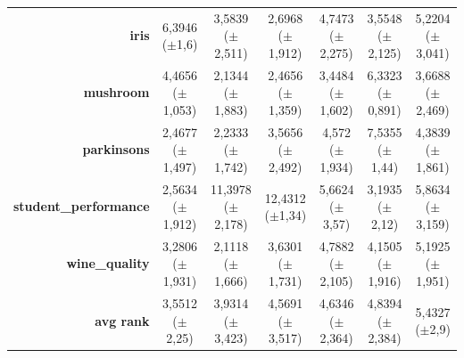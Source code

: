 \documentclass[preprint,review,12pt]{elsarticle}
\begin{document}
\begin{table}[htb]
{\begin{tabular}{r|ccc|c|c|c|}
			\textbf{iris}                 & \cellcolor[rgb]{ .965,  .91,  .514}6,3946 ($\pm$1,6)                               & \cellcolor[rgb]{ .525,  .784,  .49}3,5839 ($\pm$2,511)  & \cellcolor[rgb]{ .388,  .745,  .482}2,6968 ($\pm$1,912) & \cellcolor[rgb]{ .706,  .835,  .498}4,7473 ($\pm$2,275) & \cellcolor[rgb]{ .522,  .78,  .486}3,5548 ($\pm$2,125)  & \cellcolor[rgb]{ .78,  .859,  .502}5,2204 ($\pm$3,041)  \\
			\textbf{mushroom}             & \cellcolor[rgb]{ .71,  .835,  .498}4,4656 ($\pm$1,053)                             & \cellcolor[rgb]{ .388,  .745,  .482}2,1344 ($\pm$1,883) & \cellcolor[rgb]{ .431,  .757,  .482}2,4656 ($\pm$1,359) & \cellcolor[rgb]{ .569,  .796,  .49}3,4484 ($\pm$1,602)  & \cellcolor[rgb]{ .969,  .91,  .514}6,3323 ($\pm$0,891)  & \cellcolor[rgb]{ .6,  .804,  .494}3,6688 ($\pm$2,469)   \\
			\textbf{parkinsons}           & \cellcolor[rgb]{ .412,  .749,  .482}2,4677 ($\pm$1,497)                            & \cellcolor[rgb]{ .388,  .745,  .482}2,2333 ($\pm$1,742) & \cellcolor[rgb]{ .541,  .788,  .49}3,5656 ($\pm$2,492)  & \cellcolor[rgb]{ .655,  .82,  .494}4,572 ($\pm$1,934)   & \cellcolor[rgb]{ 1,  .922,  .518}7,5355 ($\pm$1,44)     & \cellcolor[rgb]{ .635,  .816,  .494}4,3839 ($\pm$1,861) \\
			\textbf{student\_performance} & \cellcolor[rgb]{ .388,  .745,  .482}2,5634 ($\pm$1,912)                            & \cellcolor[rgb]{ .98,  .506,  .439}11,3978 ($\pm$2,178) & \cellcolor[rgb]{ .973,  .412,  .42}12,4312 ($\pm$1,34)  & \cellcolor[rgb]{ .843,  .875,  .506}5,6624 ($\pm$3,57)  & \cellcolor[rgb]{ .478,  .769,  .486}3,1935 ($\pm$2,12)  & \cellcolor[rgb]{ .875,  .882,  .51}5,8634 ($\pm$3,159)  \\
			\textbf{wine\_quality}        & \cellcolor[rgb]{ .569,  .796,  .49}3,2806 ($\pm$1,931)                             & \cellcolor[rgb]{ .388,  .745,  .482}2,1118 ($\pm$1,666) & \cellcolor[rgb]{ .624,  .812,  .494}3,6301 ($\pm$1,731) & \cellcolor[rgb]{ .808,  .863,  .506}4,7882 ($\pm$2,105) & \cellcolor[rgb]{ .706,  .835,  .498}4,1505 ($\pm$1,916) & \cellcolor[rgb]{ .871,  .882,  .51}5,1925 ($\pm$1,951)  \\
			\midrule
			\textbf{avg rank}             & \cellcolor[rgb]{ .388,  .745,  .482}3,5512 ($\pm$2,25)                             & \cellcolor[rgb]{ .471,  .769,  .486}3,9314 ($\pm$3,423) & \cellcolor[rgb]{ .616,  .808,  .494}4,5691 ($\pm$3,517) & \cellcolor[rgb]{ .631,  .812,  .494}4,6346 ($\pm$2,364) & \cellcolor[rgb]{ .675,  .827,  .498}4,8394 ($\pm$2,384) & \cellcolor[rgb]{ .808,  .867,  .506}5,4327 ($\pm$2,9)   \\

\end{tabular}}
\end{table}
\end{document}
